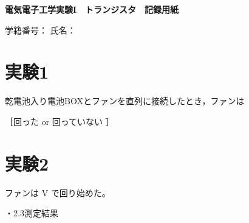 
\begin{center}
  {\sffamily\gtfamily\bfseries\Large 電気電子工学実験I　トランジスタ　記録用紙}
\end{center}

\vspace{0.6\baselineskip}
\begin{flushright}
  学籍番号：\underline{\hspace{12\zw}}\quad
  氏名：\underline{\hspace{12\zw}}
\end{flushright}
\vspace{0.8\baselineskip}

\section*{実験1}

\quad 乾電池入り電池BOXとファンを直列に接続したとき，ファンは

\begin{center}
  ［\quad 回った \quad or \quad 回っていない \quad］
\end{center}

\section*{実験2}

\quad ファンは \underline{\hspace{8\zw}} V で回り始めた。

\medskip
{}・2.3\quad 測定結果

